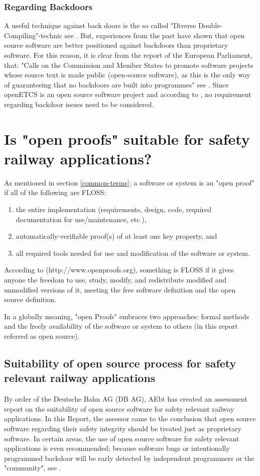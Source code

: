 \documentclass{template/openetcs_report}
\begin{document}
\subsubsection{Regarding Backdoors}
\label{Backdoor}
A useful technique against back doors is the so called "Diverse Double-Compiling"-technic see \cite{Wheeler09}.
But, experiences from the past have shown that open source software are better positioned against backdoors than proprietary software. For this reason, it is clear from the report of the European Parliament, that: "Calls on the Commission and Member States to promote software projects whose source text is made public (open-source software), as this is the only way of guaranteeing that no backdoors are built into programmes" see \cite{EUParl}.
Since openETCS is an open source software project and according to \cite{EUParl}, no requirement regarding backdoor issues need to be considered.



\section{Is "open proofs" suitable for safety railway applications?}
As mentioned in section \ref{common-terms}; a software or system is an "open proof" if all of the following are FLOSS: 
\begin{enumerate}
\itemsep=0pt
  \item the entire implementation (requirements, design, code, required documentation for use/maintenance, etc.),
  \item automatically-verifiable proof(s) of at least one key property, and
  \item all required tools needed for use and modification of the software or system.
\end{enumerate}

According to (http://www.openproofs.org), something is FLOSS if it gives anyone the freedom to use, study, modify, and redistribute modified and unmodified versions of it, meeting the free software definition and the open source definition.

In a globally meaning, "open Proofs" embraces two approaches: formal methods and the freely availability of the software or system to others (in this report referred as open source).

\subsection{Suitability of open source process for safety relevant railway applications}
By order of the Deutsche Bahn AG (DB AG), AEbt has created an assessment report on the suitability of open source software for safety relevant railway applications.
In this Report, the assessor came to the conclusion that open source software regarding their safety integrity should be treated just as proprietary software. In certain areas, the use of open source software for safety relevant applications is even recommended; because software bugs or intentionally programmed backdoor will be early detected by independent programmers or the "community", see \cite{AEbt-doc}.
\end{document}
